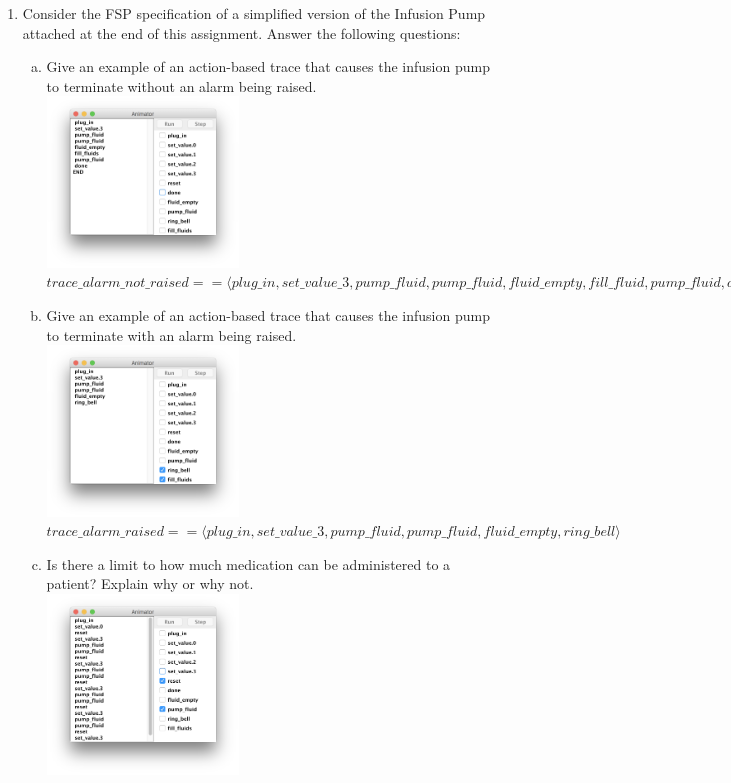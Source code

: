\documentclass{article}
\begin{document}
\begin{enumerate}[1.]
 \item Consider the FSP specification of a simplified version of the Infusion Pump attached at the end of this assignment.
 Answer the following questions:
    \begin{enumerate}[a.]
    \item Give an example of an action-based trace that causes the infusion pump to terminate without an alarm being raised. \\
      \includegraphics[width=2in]{no_alarm.png} \\
      $trace\_alarm\_not\_raised == \langle plug\_in, set\_value\_3, pump\_fluid, pump\_fluid, fluid\_empty, fill\_fluid, pump\_fluid, done  \rangle $ \\
    \item Give an example of an action-based trace that causes the infusion pump to terminate with an alarm being raised. \\
      \includegraphics[width=2in]{alarm.png} \\
      $trace\_alarm\_raised ==  \langle plug\_in, set\_value\_3, pump\_fluid, pump\_fluid, fluid\_empty, ring\_bell  \rangle $ \\
    \item Is there a limit to how much medication can be administered to a patient? Explain why or why not. \\
      \includegraphics[width=2in]{reset.png} \\

\end{enumerate}
\end{enumerate}
\end{document}
